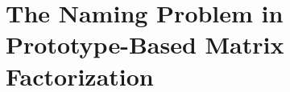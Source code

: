 \section{The Naming Problem in Prototype-Based Matrix Factorization}
\label{sec:intro-posthoc-naming}
